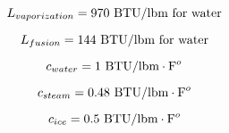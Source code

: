 $$L_{vaporization} = 970 \hbox{ BTU/lbm for water}$$

$$L_{fusion} = 144 \hbox{ BTU/lbm for water}$$

$$c_{water} = 1 \hbox{ BTU/lbm} \cdot \hbox{F}^{o}$$

$$c_{steam} = 0.48 \hbox{ BTU/lbm} \cdot \hbox{F}^{o}$$

$$c_{ice} = 0.5 \hbox{ BTU/lbm} \cdot \hbox{F}^{o}$$





